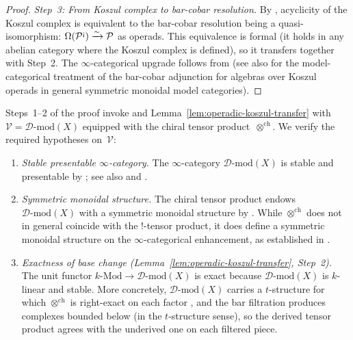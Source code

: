\begin{proof}
\emph{Step~3: From Koszul complex to bar-cobar resolution.}
By \cite[Theorem~11.3.3]{LV12}, acyclicity of the Koszul complex
is equivalent to the bar-cobar resolution being a quasi-isomorphism:
$\Omega(\mathcal{P}^{\text{\textexclamdown}}) \xrightarrow{\sim}
\mathcal{P}$ as operads.  This equivalence is formal
(it holds in any abelian category where the Koszul complex is
defined), so it transfers together with Step~2.
The $\infty$-categorical upgrade follows from
\cite[Theorem~11.4.1]{LV12} (see also
\cite[§16]{Fresse-operads} for the model-categorical treatment
of the bar-cobar adjunction for algebras over Koszul operads in
general symmetric monoidal model categories).
\end{proof}

\begin{remark}\label{rem:e1-koszul-hypotheses}
Steps~1--2 of the proof invoke \cite[Theorem~11.4.1]{LV12} and
Lemma~\ref{lem:operadic-koszul-transfer} with
$\mathcal{V} = \mathcal{D}\text{-mod}(X)$ equipped with the chiral
tensor product~$\otimes^{\mathrm{ch}}$.  We verify the required
hypotheses on~$\mathcal{V}$:
\begin{enumerate}
\item \emph{Stable presentable $\infty$-category.}
The $\infty$-category $\mathcal{D}\text{-mod}(X)$ is stable and
presentable by \cite[Chapter~I.3]{GR17}; see also
\cite[Proposition~5.5.3.6]{HA} and \cite[§1.1]{HA}.
\item \emph{Symmetric monoidal structure.}
The chiral tensor product endows $\mathcal{D}\text{-mod}(X)$ with a
symmetric monoidal structure by \cite[3.4.10]{BD04}.  While
$\otimes^{\mathrm{ch}}$ does not in general coincide with the
$!$-tensor product, it does define a symmetric monoidal structure on
the $\infty$-categorical enhancement, as established in
\cite[Chapter~IV.5]{GR17}.
\item \emph{Exactness of base change
\textup{(}Lemma~\textup{\ref{lem:operadic-koszul-transfer}},
Step~\textup{2)}.}
The unit functor $k\text{-}\mathrm{Mod} \to \mathcal{D}\text{-mod}(X)$
is exact because $\mathcal{D}\text{-mod}(X)$ is $k$-linear and
stable.  More concretely, $\mathcal{D}\text{-mod}(X)$ carries a
$t$-structure for which $\otimes^{\mathrm{ch}}$ is right-exact on each
factor \cite[3.4.12]{BD04}, and the bar filtration produces complexes
bounded below (in the $t$-structure sense), so the derived tensor
product agrees with the underived one on each filtered piece.
\end{enumerate}
\end{remark}


